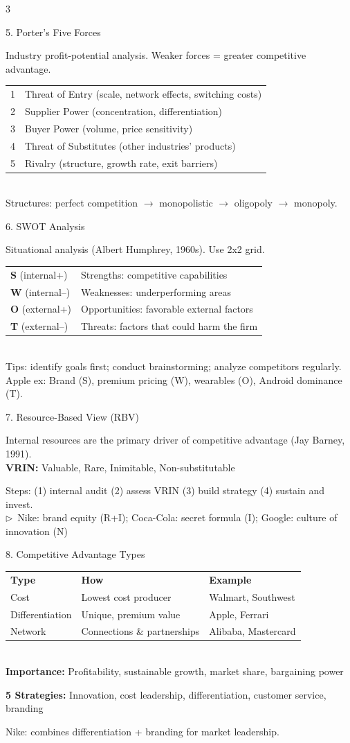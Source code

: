 \documentclass[7.5pt, letterpaper]{article}
\newcommand{\concept}[1]{%
  \vspace{2.5pt}%
  \noindent\colorbox{accent}{\parbox{\dimexpr\linewidth-2\fboxsep}{\fontsize{6.8pt}{7.5pt}\selectfont\bfseries\color{white}\strut #1\strut}}%
  \vspace{1pt}\par%
}
\newcommand{\kv}[2]{\noindent\textbf{#1:} #2\par}
\newcommand{\bul}[1]{\noindent$\triangleright$\ #1\par}
\newcommand{\minitab}[1]{%
  \begingroup
  \fontsize{6.2pt}{7pt}\selectfont
  \setlength{\tabcolsep}{2pt}
  #1
  \endgroup
}
\begin{document}
\begin{multicols}{3}
\concept{5. Porter's Five Forces}
Industry profit-potential analysis. Weaker forces = greater competitive advantage.\\
\minitab{\begin{tabular}{@{}ll@{}}
1 & Threat of Entry (scale, network effects, switching costs)\\
2 & Supplier Power (concentration, differentiation)\\
3 & Buyer Power (volume, price sensitivity)\\
4 & Threat of Substitutes (other industries' products)\\
5 & Rivalry (structure, growth rate, exit barriers)\\
\end{tabular}}\\
Structures: perfect competition $\to$ monopolistic $\to$ oligopoly $\to$ monopoly.

\concept{6. SWOT Analysis}
Situational analysis (Albert Humphrey, 1960s). Use 2x2 grid.\\
\minitab{\begin{tabular}{@{}ll@{}}
\textbf{S} (internal+) & Strengths: competitive capabilities\\
\textbf{W} (internal--) & Weaknesses: underperforming areas\\
\textbf{O} (external+) & Opportunities: favorable external factors\\
\textbf{T} (external--) & Threats: factors that could harm the firm\\
\end{tabular}}\\
Tips: identify goals first; conduct brainstorming; analyze competitors regularly. Apple ex: Brand (S), premium pricing (W), wearables (O), Android dominance (T).

\concept{7. Resource-Based View (RBV)}
Internal resources are the primary driver of competitive advantage (Jay Barney, 1991).\\
\kv{VRIN}{Valuable, Rare, Inimitable, Non-substitutable}
Steps: (1) internal audit (2) assess VRIN (3) build strategy (4) sustain and invest.\\
\bul{Nike: brand equity (R+I); Coca-Cola: secret formula (I); Google: culture of innovation (N)}

\concept{8. Competitive Advantage Types}
\minitab{\begin{tabular}{@{}lll@{}}
\textbf{Type} & \textbf{How} & \textbf{Example}\\
Cost & Lowest cost producer & Walmart, Southwest\\
Differentiation & Unique, premium value & Apple, Ferrari\\
Network & Connections \& partnerships & Alibaba, Mastercard\\
\end{tabular}}\\
\kv{Importance}{Profitability, sustainable growth, market share, bargaining power}
\kv{5 Strategies}{Innovation, cost leadership, differentiation, customer service, branding}
Nike: combines differentiation + branding for market leadership.


\end{multicols}
\end{document}
